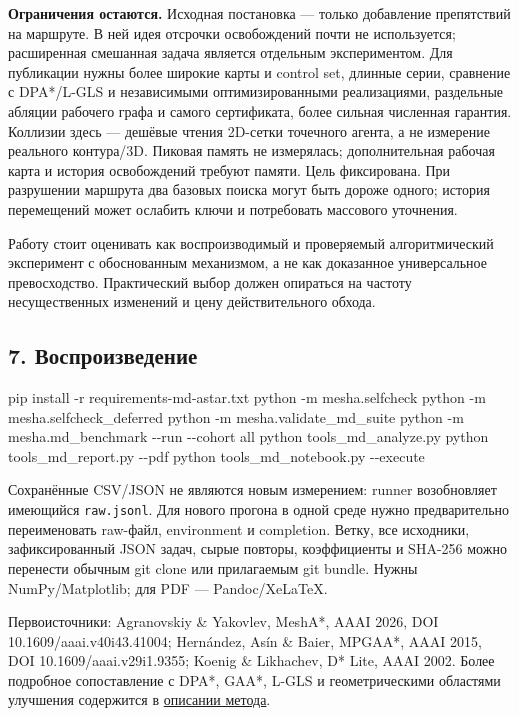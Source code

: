 \documentclass[
  10pt,
]{article}
\newenvironment{Shaded}{}{}
\newcommand{\AttributeTok}[1]{\textcolor[rgb]{0.49,0.56,0.16}{#1}}
\newcommand{\ExtensionTok}[1]{#1}
\newcommand{\NormalTok}[1]{#1}
\begin{document}
\textbf{Ограничения остаются.} Исходная постановка --- только добавление
препятствий на маршруте. В ней идея отсрочки освобождений почти не
используется; расширенная смешанная задача является отдельным
экспериментом. Для публикации нужны более широкие карты и control set,
длинные серии, сравнение с DPA*/L-GLS и независимыми оптимизированными
реализациями, раздельные абляции рабочего графа и самого сертификата,
более сильная численная гарантия. Коллизии здесь --- дешёвые чтения
2D-сетки точечного агента, а не измерение реального контура/3D. Пиковая
память не измерялась; дополнительная рабочая карта и история
освобождений требуют памяти. Цель фиксирована. При разрушении маршрута
два базовых поиска могут быть дороже одного; история перемещений может
ослабить ключи и потребовать массового уточнения.

Работу стоит оценивать как воспроизводимый и проверяемый алгоритмический
эксперимент с обоснованным механизмом, а не как доказанное универсальное
превосходство. Практический выбор должен опираться на частоту
несущественных изменений и цену действительного обхода.

\subsection{7.
Воспроизведение}\label{ux432ux43eux441ux43fux440ux43eux438ux437ux432ux435ux434ux435ux43dux438ux435}

\begin{Shaded}
\begin{Highlighting}[]
\ExtensionTok{pip}\NormalTok{ install }\AttributeTok{{-}r}\NormalTok{ requirements{-}md{-}astar.txt}
\ExtensionTok{python} \AttributeTok{{-}m}\NormalTok{ mesha.selfcheck}
\ExtensionTok{python} \AttributeTok{{-}m}\NormalTok{ mesha.selfcheck\_deferred}
\ExtensionTok{python} \AttributeTok{{-}m}\NormalTok{ mesha.validate\_md\_suite}
\ExtensionTok{python} \AttributeTok{{-}m}\NormalTok{ mesha.md\_benchmark }\AttributeTok{{-}{-}run} \AttributeTok{{-}{-}cohort}\NormalTok{ all}
\ExtensionTok{python}\NormalTok{ tools\_md\_analyze.py}
\ExtensionTok{python}\NormalTok{ tools\_md\_report.py }\AttributeTok{{-}{-}pdf}
\ExtensionTok{python}\NormalTok{ tools\_md\_notebook.py }\AttributeTok{{-}{-}execute}
\end{Highlighting}
\end{Shaded}

Сохранённые CSV/JSON не являются новым измерением: runner возобновляет
имеющийся \texttt{raw.jsonl}. Для нового прогона в одной среде нужно
предварительно переименовать raw-файл, environment и completion. Ветку,
все исходники, зафиксированный JSON задач, сырые повторы, коэффициенты и
SHA-256 можно перенести обычным git clone или прилагаемым git bundle.
Нужны NumPy/Matplotlib; для PDF --- Pandoc/XeLaTeX.

Первоисточники: Agranovskiy \& Yakovlev, MeshA*, AAAI 2026, DOI
10.1609/aaai.v40i43.41004; Hernández, Asín \& Baier, MPGAA*, AAAI 2015,
DOI 10.1609/aaai.v29i1.9355; Koenig \& Likhachev, D* Lite, AAAI 2002.
Более подробное сопоставление с DPA*, GAA*, L-GLS и геометрическими
областями улучшения содержится в \href{method.md}{описании метода}.
\end{document}

